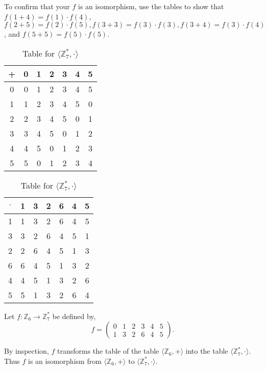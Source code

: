 \documentclass[12pt]{article}
\begin{document}
To confirm that your $f$ is an isomorphism, use the tables to show that $f(1+4)=f(1) \cdot f(4)$, $f(2+5)=f(2) \cdot f(5), f(3+3)=f(3) \cdot f(3), f(3+4)=f(3) \cdot f(4)$, and $f(5+5)=f(5) \cdot f(5)$. \\

\begin{table}[h]
	  \begin{minipage}{0.5\textwidth}
		\centering
		\begin{tabular}{|c|c|c|c|c|c|c|}
		\hline
		+ & 0 & 1 & 2 & 3 & 4 & 5\\
		\hline
		0 & 0 & 1 & 2 & 3 & 4 & 5\\
		\hline
		1 & 1 & 2 & 3 & 4 & 5 & 0\\
		\hline
		2 & 2 & 3 & 4 & 5 & 0 & 1\\
		\hline
		3 & 3 & 4 & 5 & 0 & 1 & 2\\
		\hline
		4 & 4 & 5 & 0 & 1 & 2 & 3\\
		\hline
		5 & 5 & 0 & 1 & 2 & 3 & 4\\
		\hline
		\end{tabular}
		\caption{Table for \( \langle \mathbb{Z}_6, +  \rangle \)}
	\end{minipage}
	\begin{minipage}{0.5\textwidth}
		\centering
		\begin{tabular}{|c|c|c|c|c|c|c|}
		\hline
		\(\cdot\) & 1 & 3 & 2 & 6 & 4 & 5\\
		\hline
		1 & 1 & 3 & 2 & 6 & 4 & 5\\
		\hline
		3 & 3 & 2 & 6 & 4 & 5 & 1\\
		\hline
		2 & 2 & 6 & 4 & 5 & 1 & 3\\
		\hline
		6 & 6 & 4 & 5 & 1 & 3 & 2\\
		\hline
		4 & 4 & 5 & 1 & 3 & 2 & 6\\
		\hline
		5 & 5 & 1 & 3 & 2 & 6 & 4\\
		\hline
		\end{tabular}
		\caption{Table for \( \langle \mathbb{Z}^*_7, \cdot  \rangle \)}
	\end{minipage}
\end{table}
Let $f:\mathbb{Z}_6 \rightarrow \mathbb{Z}^*_7$ be defined by,
\[
f = \begin{pmatrix}
	0 & 1 & 2 & 3 & 4 & 5 \\
  	1 & 3 & 2 & 6 & 4 & 5
\end{pmatrix}.
\]

By inspection, $f$ transforms the table of the table $\langle \mathbb{Z}_6, +  \rangle$ into the 
table $\langle \mathbb{Z}^*_7, \cdot  \rangle$. Thus $f$ is an isomorphism from $\langle \mathbb{Z}_6, +  \rangle$ to 
$\langle \mathbb{Z}^*_7, \cdot  \rangle$.\\
\end{document}
